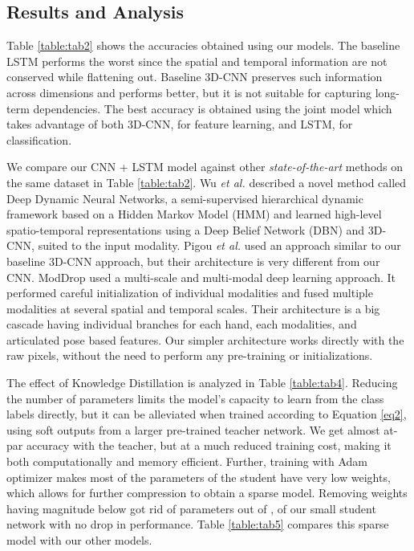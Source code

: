 \documentclass{article}
\begin{document}
\subsection{Results and Analysis}
\label{ssec:result}

Table \ref{table:tab2} shows the accuracies obtained using our models. The baseline LSTM performs the worst since the spatial and temporal information are not conserved while flattening out. Baseline 3D-CNN preserves such information across dimensions and performs better, but it is not suitable for capturing long-term dependencies. The best accuracy is obtained using the joint model which takes advantage of both 3D-CNN, for feature learning, and LSTM, for classification.

We compare our CNN + LSTM model against other \textit{state-of-the-art} methods on the same dataset in Table \ref{table:tab2}. Wu \textit{et al.} \cite{7423804} described a novel method called Deep Dynamic Neural Networks, a semi-supervised hierarchical dynamic framework based on a Hidden Markov Model (HMM) and learned high-level spatio-temporal representations using a Deep Belief Network (DBN) and 3D-CNN, suited to the input modality. Pigou \textit{et al.} \cite{Pigou2015} used an approach similar to our baseline 3D-CNN approach, but their architecture is very different from our CNN. ModDrop \cite{DBLP:journals/corr/NeverovaWTN15} used a multi-scale and multi-modal deep learning approach. It performed careful initialization of individual modalities and fused multiple modalities at several spatial and temporal scales. Their architecture is a big cascade having individual branches for each hand, each modalities, and articulated pose based features. Our simpler architecture works directly with the raw pixels, without the need to perform any pre-training or initializations.

The effect of Knowledge Distillation is analyzed in Table \ref{table:tab4}. Reducing the number of parameters limits the model's capacity to learn from the class labels directly, but it can be alleviated when trained according to Equation \ref{eq2}, using soft outputs from a larger pre-trained teacher network. We get almost at-par accuracy with the teacher, but at a much reduced training cost, making it both computationally and memory efficient. Further, training with Adam optimizer makes most of the parameters of the student have very low weights, which allows for further compression to obtain a sparse model. Removing weights having magnitude below  got rid of  parameters out of , of our small student network with no drop in performance. Table \ref{table:tab5} compares this sparse model with our other models.
\end{document}
